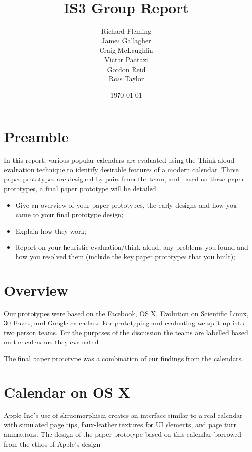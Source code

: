 \documentclass{article}
\title{IS3 Group Report}
\author{
  Richard Fleming \\
  James Gallagher \\
  Craig McLaughlin \\
  Victor Pantazi \\
  Gordon Reid \\
  Ross Taylor}
\date{\today}
\begin{document}

\maketitle


\section{Preamble}

In this report, various popular calendars are evaluated using the
Think-aloud evaluation technique to identify desirable features of a
modern calendar. Three paper prototypes are designed by pairs from the
team, and based on these paper prototypes, a final paper prototype will
be detailed.


\begin{itemize}
\item Give an overview of your paper prototypes, the early designs and
how you came to your final prototype design;

\item Explain how they work;

\item Report on your heuristic evaluation/think aloud, any problems you
found and how you resolved them (include the key paper prototypes that
you built);
\end{itemize}

\section{Overview}

Our prototypes were based on the Facebook, OS X, Evolution on Scientific
Linux, 30 Boxes, and Google calendars. For prototyping and evaluating we split up
into two person teams. For the purposes of the discussion the teams are
labelled based on the calendars they evaluated.

The final paper prototype was a combination of our findings from the
calendars.

\section{Calendar on OS X}

Apple Inc.'s use of skeuomorphism creates an interface similar to a real 
calendar with simulated page rips, faux-leather textures for UI
elements, and page turn animations. The design of the paper prototype
based on this calendar borrowed from the ethos of Apple's design.
\end{document}
